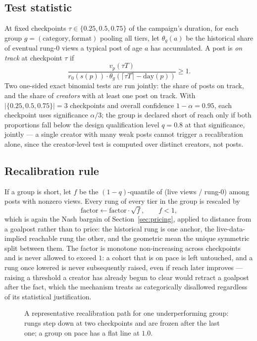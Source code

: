 \documentclass[11pt]{article}
\begin{document}
\subsection{Test statistic}

At fixed checkpoints $\tau \in \{0.25, 0.5, 0.75\}$ of the campaign's duration, for each group
$g = (\text{category}, \text{format})$ pooling all tiers, let $\theta_g(a)$ be the historical share
of eventual rung-0 views a typical post of age $a$ has accumulated. A post is \emph{on track} at
checkpoint $\tau$ if
$$
\frac{v_p(\tau T)}{r_0(s(p)) \cdot \theta_g(\lceil \tau T \rceil - \text{day}(p))} \ge 1.
$$
Two one-sided exact binomial tests are run jointly: the share of posts on track, and the share of
\emph{creators} with at least one post on track. With $|\{0.25,0.5,0.75\}| = 3$ checkpoints and
overall confidence $1-\alpha = 0.95$, each checkpoint uses significance $\alpha/3$; the group is
declared short of reach only if both proportions fall below the design qualification level $q=0.8$
at that significance, jointly — a single creator with many weak posts cannot trigger a
recalibration alone, since the creator-level test is computed over distinct creators, not posts.

\subsection{Recalibration rule}

If a group is short, let $f$ be the $(1-q)$-quantile of (live views $/$ rung-0) among posts with
nonzero views. Every rung of every tier in the group is rescaled by
$$
\text{factor} \leftarrow \text{factor} \cdot \sqrt{f}, \qquad f < 1,
$$
which is again the Nash bargain of Section~\ref{sec:pricing}, applied to distance from a goalpost
rather than to price: the historical rung is one anchor, the live-data-implied reachable rung the
other, and the geometric mean the unique symmetric split between them. The factor is monotone
non-increasing across checkpoints and is never allowed to exceed $1$: a cohort that is on pace is
left untouched, and a rung once lowered is never subsequently raised, even if reach later improves —
raising a threshold a creator has already begun to clear would retract a goalpost after the fact,
which the mechanism treats as categorically disallowed regardless of its statistical justification.

\begin{figure}[h]
\centering
{}
\caption{A representative recalibration path for one underperforming group: rungs step down at two
checkpoints and are frozen after the last one; a group on pace has a flat line at $1.0$.}
\label{fig:fairreach}
\end{figure}
\end{document}
